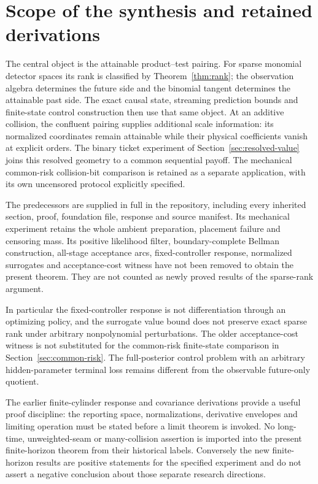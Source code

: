 \section{Scope of the synthesis and retained derivations}\label{sec:scope}
The central object is the attainable product--test pairing. For sparse
monomial detector spaces its rank is classified by
Theorem~\ref{thm:rank}; the observation algebra determines the future
side and the binomial tangent determines the attainable past side. The
exact causal state, streaming prediction bounds and finite-state control
construction then use that same object. At an additive collision, the
confluent pairing supplies additional scale information: its normalized
coordinates remain attainable while their physical coefficients vanish
at explicit orders. The binary ticket experiment
of Section~\ref{sec:resolved-value} joins this resolved geometry to a
common sequential payoff. The mechanical common-risk collision-bit
comparison is retained as a separate application, with its own uncensored
protocol explicitly specified.

The predecessors \cite{A1v5,A1v6} are supplied in full in the repository,
including every inherited section, proof, foundation file, response and
source manifest. Its mechanical experiment retains the whole ambient
preparation, placement failure and censoring mass. Its positive likelihood
filter, boundary-complete Bellman construction, all-stage acceptance arcs,
fixed-controller response, normalized surrogates and acceptance-cost witness
have not been removed to obtain the present theorem. They are not counted
as newly proved results of the sparse-rank argument.

In particular the fixed-controller response is not differentiation through
an optimizing policy, and the surrogate value bound does not preserve
exact sparse rank under arbitrary nonpolynomial perturbations. The older
acceptance-cost witness is not substituted for the common-risk finite-state
comparison in Section~\ref{sec:common-risk}. The full-posterior control
problem with an arbitrary hidden-parameter terminal loss remains different
from the observable future-only quotient.

The earlier finite-cylinder response and covariance derivations
\cite{A1round33} provide a useful proof discipline: the reporting space,
normalizations, derivative envelopes and limiting operation must be stated
before a limit theorem is invoked. No long-time, unweighted-seam or
many-collision assertion is imported into the present finite-horizon theorem
from their historical labels. Conversely the new finite-horizon results
are positive statements for the specified experiment and do not assert a
negative conclusion about those separate research directions.

